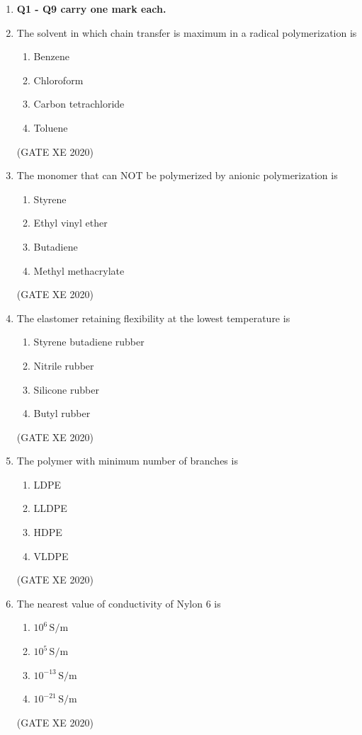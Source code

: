 \documentclass[12pt]{article}
\begin{document}
\begin{enumerate}

\item[] \textbf{Q1 - Q9 carry one mark each.}
\item The solvent in which chain transfer is maximum in a radical polymerization is  
\begin{enumerate}
\item Benzene  
\item Chloroform  
\item Carbon tetrachloride  
\item Toluene  
\end{enumerate}  
(GATE XE 2020)

\item The monomer that can NOT be polymerized by anionic polymerization is  
\begin{enumerate}
\item Styrene  
\item Ethyl vinyl ether  
\item Butadiene  
\item Methyl methacrylate  
\end{enumerate}  
(GATE XE 2020)

\item The elastomer retaining flexibility at the lowest temperature is  
\begin{enumerate}
\item Styrene butadiene rubber  
\item Nitrile rubber  
\item Silicone rubber  
\item Butyl rubber  
\end{enumerate}  
(GATE XE 2020)

\item The polymer with minimum number of branches is  
\begin{enumerate}
\item LDPE  
\item LLDPE  
\item HDPE  
\item VLDPE  
\end{enumerate}  
(GATE XE 2020)

\item The nearest value of conductivity of Nylon 6 is  
\begin{enumerate}
\item $10^6 \,\text{S/m}$  
\item $10^5 \,\text{S/m}$  
\item $10^{-13} \,\text{S/m}$  
\item $10^{-21} \,\text{S/m}$  
\end{enumerate}  
(GATE XE 2020)


\end{enumerate}
\end{document}
